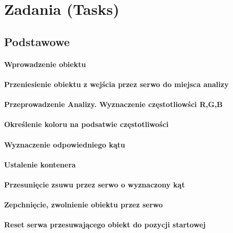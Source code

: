 \documentclass[12pt]{article}
\begin{document}
\section{Zadania (Tasks)}
\subsection{Podstawowe}
\paragraph{Wprowadzenie obiektu}
\paragraph{Przeniesienie obiektu z wejścia przez serwo do miejsca analizy}
\paragraph{Przeprowadzenie Analizy. Wyznaczenie częstotliowści R,G,B}
\paragraph{Określenie koloru na podsatwie częstotliwości}
\paragraph{Wyznaczenie odpowiedniego kątu}
\paragraph{Ustalenie kontenera}
\paragraph{Przesunięcie zsuwu przez serwo o wyznaczony kąt}
\paragraph{Zepchnięcie, zwolnienie obiektu przez serwo}
\paragraph{Reset serwa przesuwającego obiekt do pozycji startowej}
\end{document}
